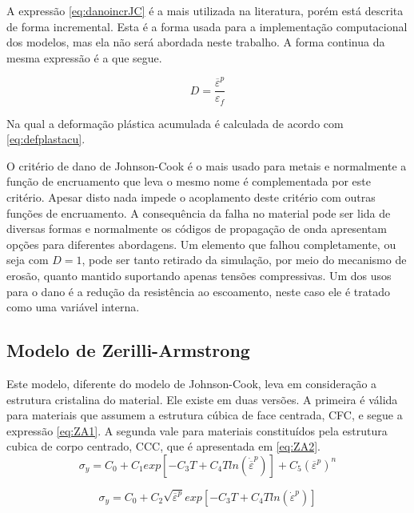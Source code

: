 A expressão \ref{eq:danoincrJC} é a mais utilizada na literatura, porém está descrita de forma incremental. Esta é a forma usada para a implementação computacional dos modelos, mas ela não será abordada neste trabalho. A forma continua da mesma expressão é a que segue.

\begin{equation}
    D = \frac{\overline{\varepsilon}^p}{\varepsilon_f}
\end{equation}

Na qual a deformação plástica acumulada é calculada de acordo com \ref{eq:defplastacu}.

O critério de dano de Johnson-Cook é o mais usado para metais e normalmente a função de encruamento que leva o mesmo nome é complementada por este critério. Apesar disto nada impede o acoplamento deste critério com outras funções de encruamento. A consequência da falha no material pode ser lida de diversas formas e normalmente os códigos de propagação de onda apresentam opções para diferentes abordagens. Um elemento que falhou completamente, ou seja com $ D = 1  $, pode ser tanto retirado da simulação, por meio do mecanismo de erosão, quanto mantido suportando apenas tensões compressivas. Um dos usos para o dano é a redução da resistência ao escoamento, neste caso ele é tratado como uma variável interna.

\subsection{Modelo de Zerilli-Armstrong}
 
 Este modelo, diferente do modelo de Johnson-Cook, leva em consideração a estrutura cristalina do material. Ele existe em duas versões. A primeira é válida para materiais que assumem a estrutura cúbica de face centrada, CFC, e segue a expressão \ref{eq:ZA1}. A segunda vale para materiais constituídos pela estrutura cubica de corpo centrado, CCC, que é apresentada em \ref{eq:ZA2}. \\
 
 \begin{equation} \label{eq:ZA1}
     \sigma_y = C_0 + C_1 exp[-C_3T + C_4Tln(\dot{\overline{\varepsilon}}^p)] + C_5 (\overline{\varepsilon}^p)^n
 \end{equation}
 
  \begin{equation} \label{eq:ZA2}
     \sigma_y = C_0 + C_2\sqrt{\overline{\varepsilon}^p}exp[-C_3T + C_4Tln(\dot{\varepsilon}^p)] 
 \end{equation}
 
